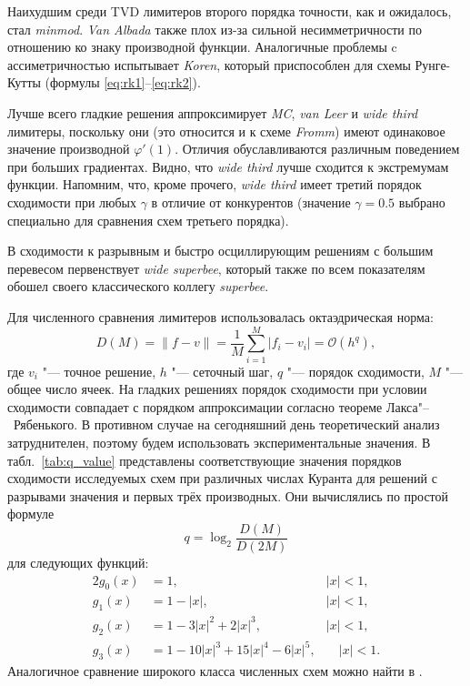 \documentclass[a4paper,10pt]{article}
\begin{document}
Наихудшим среди TVD лимитеров второго порядка точности, как и ожидалось, стал \textit{minmod}.
\textit{Van Albada} также плох из-за сильной несимметричности по отношению ко знаку производной функции.
Аналогичные проблемы c ассиметричностью испытывает \textit{Koren}, который приспособлен для схемы Рунге-Кутты (формулы \ref{eq:rk1}--\ref{eq:rk2}).

Лучше всего гладкие решения аппроксимирует \textit{MC}, \textit{van Leer} и \textit{wide third} лимитеры,
поскольку они (это относится и к схеме \textit{Fromm}) имеют одинаковое значение производной \(\varphi'(1)\).
Отличия обуславливаются различным поведением при больших градиентах.
Видно, что \textit{wide third} лучше сходится к экстремумам функции.
Напомним, что, кроме прочего, \textit{wide third} имеет третий порядок сходимости при любых \(\gamma\) в отличие от конкурентов
(значение \(\gamma=0.5\) выбрано специально для сравнения схем третьего порядка).

В сходимости к разрывным и быстро осциллирующим решениям с большим перевесом первенствует \textit{wide superbee},
который также по всем показателям обошел своего классического коллегу \textit{superbee}.

Для численного сравнения лимитеров использовалась октаэдрическая норма:
\begin{equation}\label{eq:norm}
	D(M) = \|f-v\| = \frac1{M}\sum_{i=1}^{M}|f_i-v_i| = \mathcal{O}(h^q),
\end{equation}
где \(v_i\) "--- точное решение, \(h\) "--- сеточный шаг, \(q\) "--- порядок сходимости, \(M\) "--- общее число ячеек.
На гладких решениях порядок сходимости при условии сходимости совпадает с порядком аппроксимации согласно теореме Лакса"--~Рябенького.
В противном случае на сегодняшний день теоретический анализ затруднителен, поэтому будем использовать экспериментальные значения.
В табл.~\ref{tab:q_value} представлены соответствующие значения порядков сходимости исследуемых схем при различных числах Куранта
для решений с разрывами значения и первых трёх производных. Они вычислялись по простой формуле
\[ q = \log_2\frac{D(M)}{D(2M)} \]
для следующих функций:
\begin{alignat*}{2}
	 g_0(x) &= 1,\quad &|x| < 1, \\
	 g_1(x) &= 1-|x|,\quad &|x| < 1, \\
	 g_2(x) &= 1-3|x|^2+2|x|^3,\quad &|x| < 1, \\
	 g_3(x) &= 1-10|x|^3+15|x|^4-6|x|^5,&\quad |x| < 1. 
\end{alignat*}
Аналогичное сравнение широкого класса численных схем можно найти в \cite{Safronov2010}.
\end{document}
